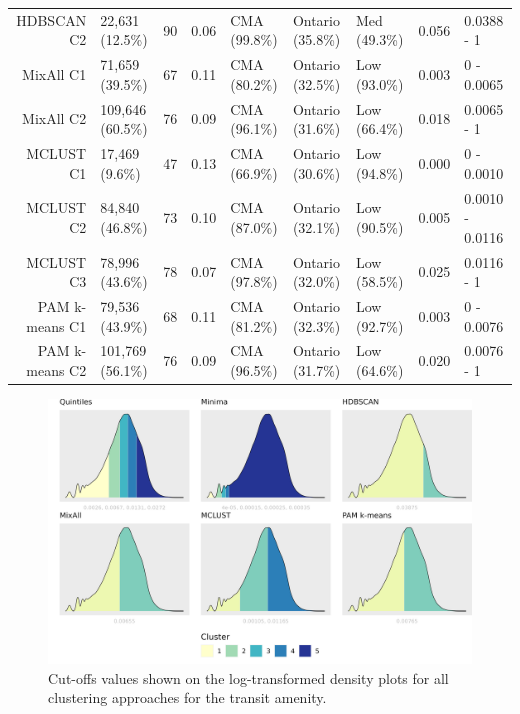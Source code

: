 \documentclass[11pt, a4paper]{article}
\begin{document}
\begin{table}[H]
{\begin{tabular}{|r|llllllll|}
\rowcolor{gray!25}  HDBSCAN C2 & 22,631 (12.5\%) & 90 & 0.06 & CMA (99.8\%) & Ontario (35.8\%) & Med (49.3\%) & 0.056 & 0.0388 - 1 \\
  MixAll C1 & 71,659 (39.5\%) & 67 & 0.11 & CMA (80.2\%) & Ontario (32.5\%) & Low (93.0\%) & 0.003 & 0 - 0.0065 \\
  MixAll C2 & 109,646 (60.5\%) & 76 & 0.09 & CMA (96.1\%) & Ontario (31.6\%) & Low (66.4\%) & 0.018 & 0.0065 - 1 \\
\rowcolor{gray!25}  MCLUST C1 & 17,469 (9.6\%) & 47 & 0.13 & CMA (66.9\%) & Ontario (30.6\%) & Low (94.8\%) & 0.000 & 0 - 0.0010 \\
\rowcolor{gray!25}  MCLUST C2 & 84,840 (46.8\%) & 73 & 0.10 & CMA (87.0\%) & Ontario (32.1\%) & Low (90.5\%) & 0.005 & 0.0010 - 0.0116 \\
\rowcolor{gray!25}  MCLUST C3 & 78,996 (43.6\%) & 78 & 0.07 & CMA (97.8\%) & Ontario (32.0\%) & Low (58.5\%) & 0.025 & 0.0116 - 1 \\
  PAM k-means C1 & 79,536 (43.9\%) & 68 & 0.11 & CMA (81.2\%) & Ontario (32.3\%) & Low (92.7\%) & 0.003 & 0 - 0.0076 \\
  PAM k-means C2 & 101,769 (56.1\%) & 76 & 0.09 & CMA (96.5\%) & Ontario (31.7\%) & Low (64.6\%) & 0.020 & 0.0076 - 1 \\
   \hline
\end{tabular}
}
\end{table}





\begin{figure}[H]
\centering
\includegraphics[width=\textwidth]{./cutoffs/by_amenity/Transit_cutoffs.png}
\caption[Transit cutoffs]{Cut-offs values shown on the log-transformed density plots for all clustering approaches for the transit amenity.}\label{transitcutoffs}
\end{figure}
\end{document}
